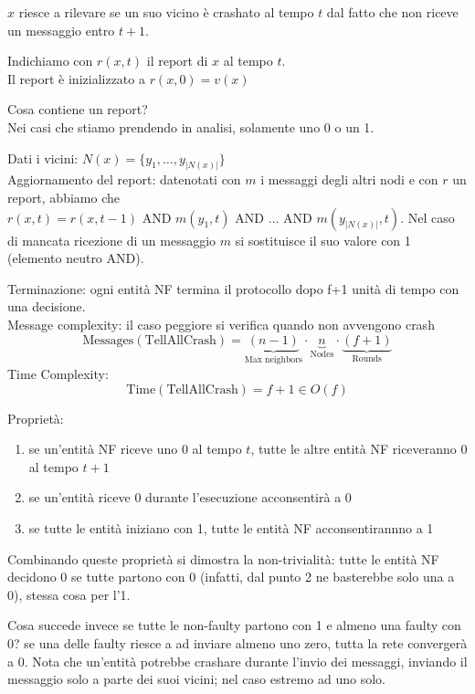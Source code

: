 $x$ riesce a rilevare se un suo vicino è crashato al tempo $t$ dal fatto che non riceve un messaggio entro $t+1$.

Indichiamo con $r(x, t)$ il report di $x$ al tempo $t$.\\
Il report è inizializzato a $r(x, 0) = v(x)$

Cosa contiene un report?\\
Nei casi che stiamo prendendo in analisi, solamente uno 0 o un 1.

Dati i vicini: $N(x) = \{ y_1, \dots, y_{|N(x)|} \}$\\
Aggiornamento del report: datenotati con $m$ i messaggi degli altri nodi e con $r$ un report, abbiamo che
$r(x, t) = r(x, t-1) \text{ AND } m(y_1, t) \text{ AND } \dots \text{ AND } m(y_{|N(x)|}, t)$.
Nel caso di mancata ricezione di un messaggio $m$ si sostituisce il suo valore con 1 (elemento neutro AND).

Terminazione: ogni entità NF termina il protocollo dopo f+1 unità di tempo con una decisione.\\
Message complexity: il caso peggiore si verifica quando non avvengono crash
$$
\text{Messages}(\text{TellAllCrash}) = \underbrace{(n-1)}_\text{Max neighbors} \cdot \underbrace{n}_\text{Nodes} \cdot \underbrace{(f+1)}_\text{Rounds}
$$
Time Complexity:
$$
\text{Time}(\text{TellAllCrash}) = f+1 \in O(f)
$$

Proprietà:
\begin{enumerate}
 \item se un'entità NF riceve uno 0 al tempo $t$, tutte le altre entità NF riceveranno 0
  al tempo $t+1$
  \item se un'entità riceve 0 durante l'esecuzione acconsentirà a 0
  \item se tutte le entità iniziano con 1, tutte le entità NF acconsentirannno a 1
\end{enumerate}

Combinando queste proprietà si dimostra la non-trivialità: tutte le entità NF decidono 0 se tutte partono con 0
(infatti, dal punto 2 ne basterebbe solo una a 0), stessa cosa per l'1.

Cosa succede invece se tutte le non-faulty partono con 1 e almeno una faulty con 0? se una delle faulty
riesce a ad inviare almeno uno zero, tutta la rete convergerà a 0. Nota che un'entità potrebbe crashare durante
l'invio dei messaggi, inviando il messaggio solo a parte dei suoi vicini; nel caso estremo ad uno solo.

